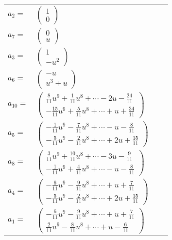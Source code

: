\documentclass[1p]{elsarticle_modified}
\theoremstyle{definition}
\begin{document}
\begin{tabular}{m{7pt} m{180pt} m{7pt} m{180pt} }
\flushright $a_{2}=$&$\begin{pmatrix}1\\0\end{pmatrix}$ \\
\flushright $a_{7}=$&$\begin{pmatrix}0\\u\end{pmatrix}$ \\
\flushright $a_{3}=$&$\begin{pmatrix}1\\- u^2\end{pmatrix}$ \\
\flushright $a_{6}=$&$\begin{pmatrix}- u\\u^3+u\end{pmatrix}$ \\
\flushright $a_{10}=$&$\begin{pmatrix}\frac{8}{11} u^9+\frac{1}{11} u^8+\cdots-2 u-\frac{24}{11}\\-\frac{15}{11} u^9+\frac{5}{11} u^8+\cdots+u+\frac{34}{11}\end{pmatrix}$ \\
\flushright $a_{5}=$&$\begin{pmatrix}-\frac{1}{11} u^9-\frac{7}{11} u^8+\cdots- u-\frac{8}{11}\\-\frac{5}{11} u^9-\frac{2}{11} u^8+\cdots+2 u+\frac{15}{11}\end{pmatrix}$ \\
\flushright $a_{8}=$&$\begin{pmatrix}\frac{3}{11} u^9+\frac{10}{11} u^8+\cdots-3 u-\frac{9}{11}\\-\frac{1}{11} u^9+\frac{4}{11} u^8+\cdots- u-\frac{8}{11}\end{pmatrix}$ \\
\flushright $a_{4}=$&$\begin{pmatrix}-\frac{6}{11} u^9-\frac{9}{11} u^8+\cdots+u+\frac{7}{11}\\-\frac{5}{11} u^9-\frac{2}{11} u^8+\cdots+2 u+\frac{15}{11}\end{pmatrix}$ \\
\flushright $a_{1}=$&$\begin{pmatrix}-\frac{6}{11} u^9-\frac{9}{11} u^8+\cdots+u+\frac{7}{11}\\\frac{2}{11} u^9-\frac{8}{11} u^8+\cdots+u-\frac{6}{11}\end{pmatrix}$ \\

\end{tabular}
\end{document}
